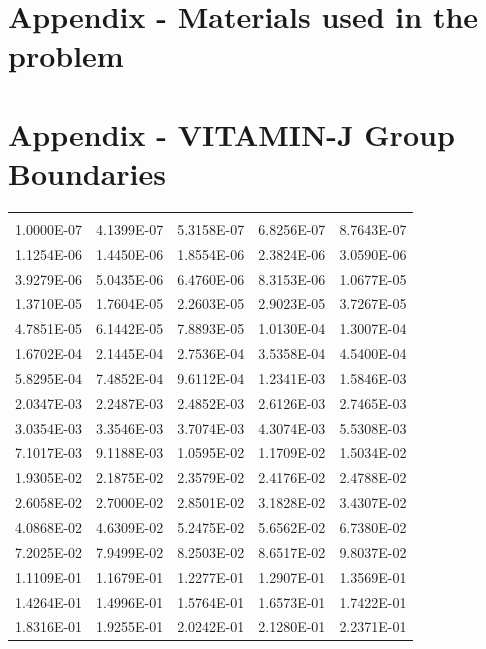 \documentclass[12pt]{article}
\begin{document}
\newpage
\clearpage


\newpage
\clearpage
\renewcommand\thesection{\Alph{section}}
\section{Appendix - Materials used in the problem}
\label{appendix_a}

\newpage
\clearpage
\section{Appendix - VITAMIN-J Group Boundaries}
\label{appendix_b}
\begin{centering}
 \begin{table}[ht!]
  \begin{tabular}{| c  c  c  c  c |}
  \hline
  \\
  1.0000E-07 & 4.1399E-07 & 5.3158E-07 & 6.8256E-07 & 8.7643E-07\\
  1.1254E-06 & 1.4450E-06 & 1.8554E-06 & 2.3824E-06 & 3.0590E-06\\
  3.9279E-06 & 5.0435E-06 & 6.4760E-06 & 8.3153E-06 & 1.0677E-05\\
  1.3710E-05 & 1.7604E-05 & 2.2603E-05 & 2.9023E-05 & 3.7267E-05\\
  4.7851E-05 & 6.1442E-05 & 7.8893E-05 & 1.0130E-04 & 1.3007E-04\\
  1.6702E-04 & 2.1445E-04 & 2.7536E-04 & 3.5358E-04 & 4.5400E-04\\
  5.8295E-04 & 7.4852E-04 & 9.6112E-04 & 1.2341E-03 & 1.5846E-03\\
  2.0347E-03 & 2.2487E-03 & 2.4852E-03 & 2.6126E-03 & 2.7465E-03\\
  3.0354E-03 & 3.3546E-03 & 3.7074E-03 & 4.3074E-03 & 5.5308E-03\\
  7.1017E-03 & 9.1188E-03 & 1.0595E-02 & 1.1709E-02 & 1.5034E-02\\
  1.9305E-02 & 2.1875E-02 & 2.3579E-02 & 2.4176E-02 & 2.4788E-02\\
  2.6058E-02 & 2.7000E-02 & 2.8501E-02 & 3.1828E-02 & 3.4307E-02\\
  4.0868E-02 & 4.6309E-02 & 5.2475E-02 & 5.6562E-02 & 6.7380E-02\\
  7.2025E-02 & 7.9499E-02 & 8.2503E-02 & 8.6517E-02 & 9.8037E-02\\
  1.1109E-01 & 1.1679E-01 & 1.2277E-01 & 1.2907E-01 & 1.3569E-01\\
  1.4264E-01 & 1.4996E-01 & 1.5764E-01 & 1.6573E-01 & 1.7422E-01\\
  1.8316E-01 & 1.9255E-01 & 2.0242E-01 & 2.1280E-01 & 2.2371E-01\\

\end{tabular}
\end{table}
\end{centering}
\end{document}

